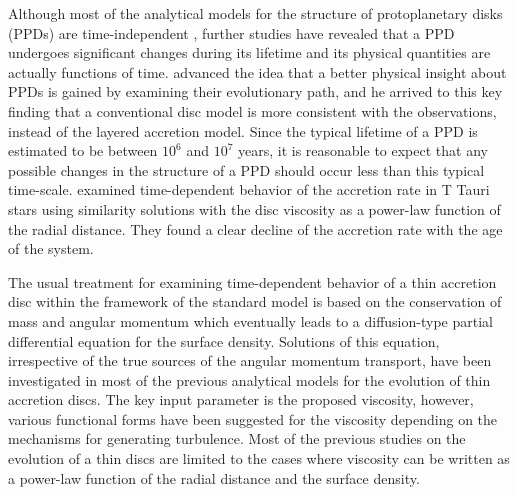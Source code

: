 \documentclass[apj]{emulateapj}
\begin{document}
Although most of the analytical models for the structure of protoplanetary disks (PPDs) are time-independent \cite[e.g.,][]{rafikov2009}, further studies have revealed that a PPD undergoes significant changes during its lifetime and its physical quantities are actually functions of time.   \cite{step98b} advanced the idea that a better physical insight about PPDs is gained by examining their evolutionary path, and he arrived to this key finding that a conventional disc model  is more consistent with the observations, instead of the layered accretion model. Since the typical lifetime of a PPD is estimated to be between $10^6$  and $10^7$ years, it is reasonable to expect that any possible changes in the structure of a PPD should occur less than this typical time-scale. \cite{hartmann98} examined time-dependent behavior of the accretion rate in T Tauri stars using similarity solutions with the disc viscosity as a power-law function of the radial distance. They found a clear decline of the accretion rate with the age of the system.

The usual treatment for examining time-dependent behavior of a thin accretion disc within the framework of the standard model \citep{SSmodel} is based on the conservation of mass and angular momentum which eventually leads to a diffusion-type partial differential equation for the surface density.  Solutions of this equation, irrespective of the true sources of the angular momentum transport, have been investigated in most of the previous analytical models for the evolution of thin accretion discs. The key input parameter is the proposed viscosity, however, various functional forms have been suggested for the viscosity depending on the mechanisms for generating turbulence. Most of the previous studies on the evolution of a thin discs are limited to the cases where viscosity can be written as a power-law function of the radial distance and the surface density.
\end{document}

